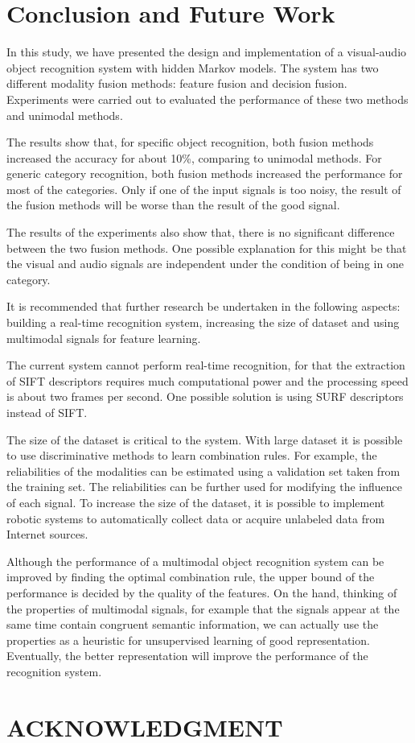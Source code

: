 \documentclass[letterpaper, 10 pt, conference]{ieeeconf}  %
\begin{document}
\section{Conclusion and Future Work}
In this study, we have presented the design and implementation of a visual-audio object recognition system with hidden Markov models. The system has two different modality fusion methods: feature fusion and decision fusion. Experiments were carried out to evaluated the performance of these two methods and unimodal methods.

The results show that, for specific object recognition, both fusion methods increased the accuracy for about 10\%, comparing to unimodal methods. For generic category recognition, both fusion methods increased the performance for most of the categories. Only if one of the input signals is too noisy, the result of the fusion methods will be worse than the result of the good signal. 

The results of the experiments also show that, there is no significant difference between the two fusion methods. One possible explanation for this might be that the visual and audio signals are independent under the condition of being in one category.

It is recommended that further research be undertaken in the following aspects: building a real-time recognition system, increasing the size of dataset and using multimodal signals for feature learning.

The current system cannot perform real-time recognition, for that the extraction of SIFT descriptors requires much computational power and the processing speed is about two frames per second. One possible solution is using SURF descriptors instead of SIFT.

The size of the dataset is critical to the system. With large dataset it is possible to use discriminative methods to learn combination rules. For example, the reliabilities of the modalities can be estimated using a validation set taken from the training set. The reliabilities can be further used for modifying the influence of each signal. To increase the size of the dataset, it is possible to implement robotic systems to automatically collect data or acquire unlabeled data from Internet sources.

Although the performance of a multimodal object recognition system can be improved by finding the optimal combination rule, the upper bound of the performance is decided by the quality of the features. On the hand, thinking of the properties of multimodal signals, for example that the signals appear at the same time contain congruent semantic information, we can actually use the properties as a heuristic for unsupervised learning of good representation. Eventually, the better representation will improve the performance of the recognition system.


\section*{ACKNOWLEDGMENT}




\end{document}
